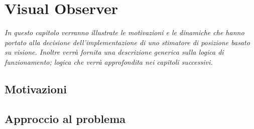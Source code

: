 \chapter{Visual Observer}
\label{chap:visualObs}

\begin{minipage}{12cm}\textit{In questo capitolo verranno illustrate le motivazioni e le dinamiche che hanno portato alla decisione dell'implementazione di uno stimatore di posizione basato su visione. Inoltre verrà fornita una descrizione generica sulla logica di funzionamento; logica che verrà approfondita nei capitoli successivi.}
\end{minipage}

\vspace*{1cm}



\section{Motivazioni}
\label{sec:motivi}


\section{Approccio al problema}
\label{sec:approccio}


